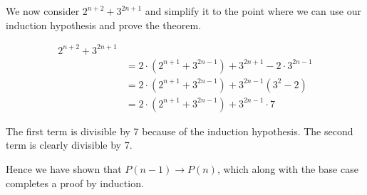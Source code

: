 \documentclass[12pt]{article}
\begin{document}
We now consider $2^{n+2} +3^{2n+1}$ and simplify it to the point where we can use our induction hypothesis and prove the theorem.

\begin{align*}
2^{n+2} + 3^{2n+1} \\
&= 2\cdot(2^{n+1} + 3^{2n-1}) + 3^{2n+1} - 2\cdot 3^{2n-1} \\
&= 2\cdot(2^{n+1} + 3^{2n-1}) + 3^{2n-1}(3^2 - 2) \\
&= 2\cdot(2^{n+1} + 3^{2n-1}) + 3^{2n-1}\cdot 7 
\end{align*}

The first term is divisible by 7 because of the induction hypothesis. The second term is clearly divisible by 7.

Hence we have shown that $P(n-1) \rightarrow P(n)$, which along with the base case completes a proof by induction.
\end{document}
